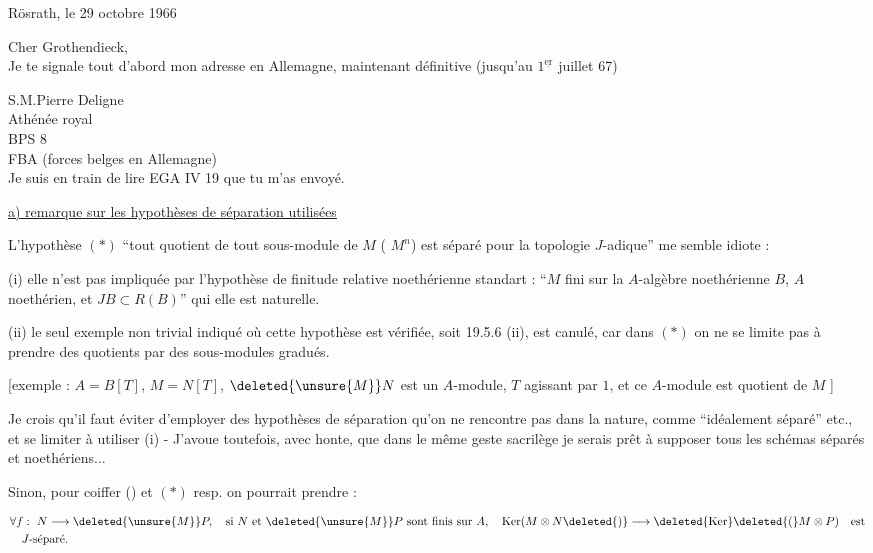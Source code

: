 
Rösrath, le 29 octobre 1966\\


Cher Grothendieck,\\

Je te signale tout d'abord mon adresse en Allemagne, maintenant définitive (jusqu'au $1^{\underline{\mathrm{er}}}$ juillet 67)

S.M.\quad Pierre Deligne\\
Athénée royal\\
BPS 8\\
FBA (forces belges en Allemagne)\\

Je suis en train de lire EGA IV 19 que tu m'as envoyé.

\uline{a) remarque sur les hypothèses de séparation utilisées}

L'hypothèse $(*)$ ``tout quotient de tout sous-module de $M$  ( $M^n$) est séparé pour la topologie $J$-adique'' me semble idiote :

(i) elle  n'est pas impliquée par l'hypothèse de finitude relative noethérienne standart : ``$M$ fini sur la $A$-algèbre noethérienne $B$, $A$ noethérien, et $JB\subset R(B)$'' qui elle est naturelle.



(ii) le seul exemple non trivial indiqué où cette hypothèse est vérifiée, soit 19.5.6 (ii), est canulé, car \deleted{$(*)$} dans $(*)$ on ne se limite pas à prendre des quotients par des sous-modules gradués.



[exemple : $A=B[T]$, $M=N[T]$, $\deleted{\unsure{M}}N$ est un $A$-module, $T$ agissant par $1$, et ce $A$-module est quotient de $M$ ]

Je crois qu'il faut éviter d'employer des hypothèses de séparation qu'on ne rencontre pas dans la nature, comme ``idéalement séparé'' etc., et se limiter à utiliser (i) - J'avoue toutefois, avec honte, que dans le même geste sacrilège je serais prêt à supposer tous les schémas séparés et noethériens...

Sinon, pour coiffer () et $(*)$ resp. on pourrait prendre :

\margin{!\ $\Bigg($}

\[
\begin{aligned}
&\forall f:\ N\longrightarrow \deleted{\unsure{M}}P,\quad \text{si } N \text{ et } \deleted{\unsure{M}}P \text{ sont finis sur } A,\quad \operatorname{Ker}(M\otimes N\deleted{)}\longrightarrow\deleted{\operatorname{Ker}}\deleted{(}M\otimes P)\quad\text{est}\\
&\quad J\text{-séparé.}
\end{aligned}
\]
